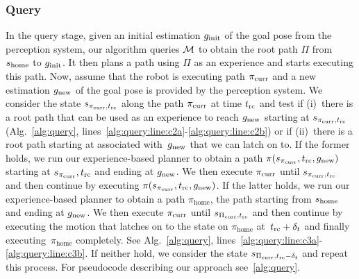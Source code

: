 \documentclass[a4paper]{report}
\begin{document}
\subsubsection{Query}
In the query stage, given an initial estimation $g_{\rm init}$ of the goal pose from the perception system, our algorithm queries $\mathcal{M}$ to obtain the root path $\Pi$ from $s_{\textrm{home}}$ to $g_{\rm init}$.
It then plans a path using $\Pi$ as an experience and starts executing this path.
%
Now, assume that the robot is executing path $\pi_{\rm curr}$ and a new estimation $g_{\rm new}$ of the goal pose is provided by the perception system.
%
We consider the state $s_{\pi_{\rm curr}, t_{\textrm{rc}}}$ along the path $\pi_{\rm curr}$ at time $t_{\textrm{rc}}$ and test if
(i)~there is a root path that can be used as an experience to reach $g_{\rm new}$ starting at $s_{\pi_{\rm curr}, t_{\textrm{rc}}}$ 
(Alg.~\ref{alg:query}, lines~\ref{alg:query:line:c2a}-\ref{alg:query:line:c2b})
or if 
(ii)~there is a root path starting at \Shome associated with~$g_{\rm new}$ that we can latch on to.
If the former holds, we run our experience-based planner to obtain a path $\pi(s_{\pi_{\rm curr}}, t_{\textrm{rc}}, g_{\rm new})$ starting at $s_{\pi_{\rm curr}},t_{\textrm{rc}}$ and ending at $g_{\rm new}$. We then execute $\pi_{\rm curr}$ until $s_{\pi_{\rm curr}, t_{\textrm{rc}}}$ and then continue by executing $\pi(s_{\pi_{\rm curr}}, t_{\textrm{rc}}, g_{\rm new})$.
%
If the latter holds, we run our experience-based planner to obtain a path $\pi_\textrm{home}$, the path starting from $s_{\textrm{home}}$ and ending at $g_{\rm new}$. We then execute $\pi_{\rm curr}$ until $s_{\Pi_{\rm curr}, t_{\textrm{rc}}}$ and then continue by executing the motion that latches on to the state on $\pi_\textrm{home}$ at~$t_{\textrm{rc}} + \delta_t$ and finally executing~$\pi_\textrm{home}$ completely.
See Alg.~\ref{alg:query}, lines~\ref{alg:query:line:c3a}-\ref{alg:query:line:c3b}.
%
If neither hold, we consider the state $s_{\Pi_{\rm curr}, t_{\textrm{rc}}-\delta_t}$ and repeat this process.
%
For pseudocode describing our approach see~\ref{alg:query}.
\end{document}
